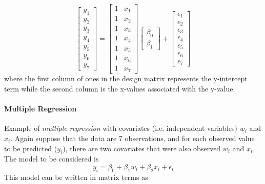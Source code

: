 \begin{equation}
  \begin{bmatrix}y_1 \\ y_2 \\ y_3 \\ y_4 \\ y_5 \\ y_6 \\ y_7 \end{bmatrix}
  =
  \begin{bmatrix}1 & x_1  \\1 & x_2  \\1 & x_3  \\1 & x_4  \\1 & x_5  \\1 & x_6 \\ 1 & x_7  \end{bmatrix}
  \begin{bmatrix} \beta_0 \\ \beta_1  \end{bmatrix}
  +
  \begin{bmatrix} \epsilon_1 \\ \epsilon_2 \\ \epsilon_3 \\ \epsilon_4 \\ \epsilon_5 \\ \epsilon_6 \\ \epsilon_7 \end{bmatrix}
\end{equation}
where the first column of ones in the design matrix represents the y-intercept term while the second column is the x-values associated with the y-value.

\paragraph{Multiple Regression} 
Example of \emph{multiple regression} with covariates (i.e. independent variables) $w_i$ and $x_i$.
Again suppose that the data are 7 observations, and for each observed value to be predicted ($y_i$), there are two covariates that were also observed $w_i$ and $x_i$. The model to be considered is
\begin{equation}
  y_i = \beta_0 + \beta_1 w_i + \beta_2 x_i + \epsilon_i
\end{equation}
This model can be written in matrix terms as

